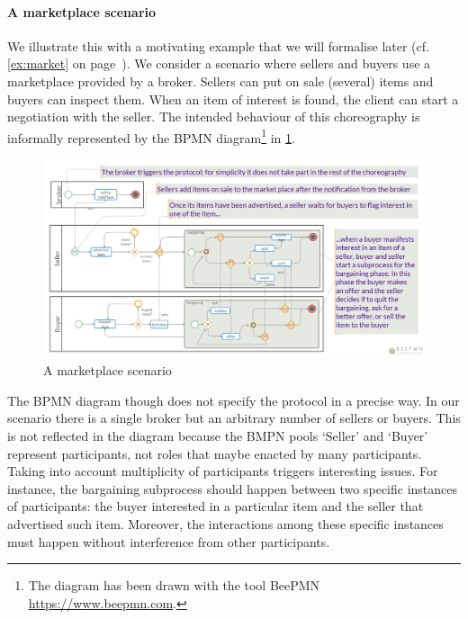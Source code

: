 % 
\paragraph{A marketplace scenario}
We illustrate this with a motivating example that we will formalise
later (cf. \cref{ex:market} on page~\pageref{ex:market}).
%
We consider a scenario where sellers and buyers use a marketplace
provided by a broker.
%
Sellers can put on sale (several) items and buyers can inspect them.
%
When an item of interest is found, the client can start a negotiation
with the seller.
%
The intended behaviour of this choreography is informally represented
by the BPMN diagram\footnote{The diagram has been drawn with the tool
  BeePMN \url{https://www.beepmn.com}.} in \cref{fig:bpmn}.
%
\begin{figure}[t!]\centering
  \includegraphics[scale=.18]{marketplace}
  \caption{A marketplace scenario\label{fig:bpmn}}
\end{figure}
%
The BPMN diagram though does not specify the protocol in a precise
way.
%
In our scenario there is a single broker but an arbitrary number of
sellers or buyers.
%
This is not reflected in the diagram because the BMPN pools `Seller'
and `Buyer' represent participants, not roles that maybe enacted by
many participants.
% 
Taking into account multiplicity of participants triggers interesting
issues.
% 
For instance, the bargaining subprocess should happen between two
specific instances of participants: the buyer interested in a
particular item and the seller that advertised such item.
% 
Moreover, the interactions among these specific instances must happen
without interference from other participants.

